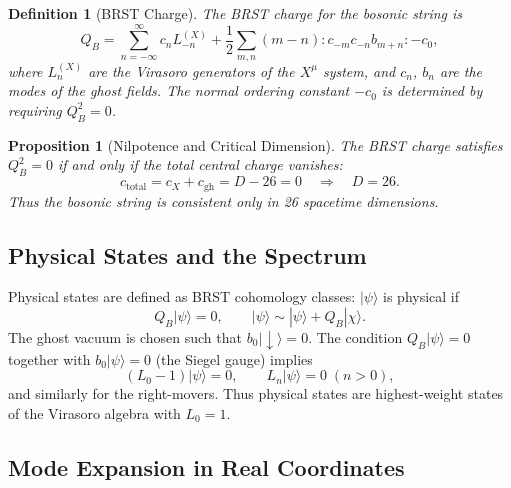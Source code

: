 \documentclass[11pt]{article}
\newtheorem{definition}{Definition}
\newtheorem{proposition}{Proposition}
\begin{document}
\begin{definition}[BRST Charge]
The BRST charge for the bosonic string is
\begin{equation}
Q_B = \sum_{n=-\infty}^{\infty} c_n L_{-n}^{(X)} + \frac{1}{2} \sum_{m,n} (m-n) :c_{-m} c_{-n} b_{m+n}: - c_0,
\end{equation}
where $L_n^{(X)}$ are the Virasoro generators of the $X^\mu$ system, and $c_n$, $b_n$ are the modes of the ghost fields. The normal ordering constant $-c_0$ is determined by requiring $Q_B^2 = 0$.
\end{definition}

\begin{proposition}[Nilpotence and Critical Dimension]
The BRST charge satisfies $Q_B^2 = 0$ if and only if the total central charge vanishes:
\begin{equation}
c_{\text{total}} = c_X + c_{\text{gh}} = D - 26 = 0 \quad \Longrightarrow \quad D = 26.
\end{equation}
Thus the bosonic string is consistent only in 26 spacetime dimensions.
\end{proposition}

\subsection{Physical States and the Spectrum}

Physical states are defined as BRST cohomology classes: $|\psi\rangle$ is physical if
\begin{equation}
Q_B |\psi\rangle = 0, \qquad |\psi\rangle \sim |\psi\rangle + Q_B |\chi\rangle.
\end{equation}
The ghost vacuum is chosen such that $b_0|\downarrow\rangle = 0$. The condition $Q_B|\psi\rangle = 0$ together with $b_0|\psi\rangle = 0$ (the Siegel gauge) implies
\begin{equation}
(L_0 - 1)|\psi\rangle = 0, \qquad L_n|\psi\rangle = 0 \;(n>0),
\end{equation}
and similarly for the right-movers. Thus physical states are highest-weight states of the Virasoro algebra with $L_0 = 1$.

\subsection{Mode Expansion in Real Coordinates}
\end{document}
